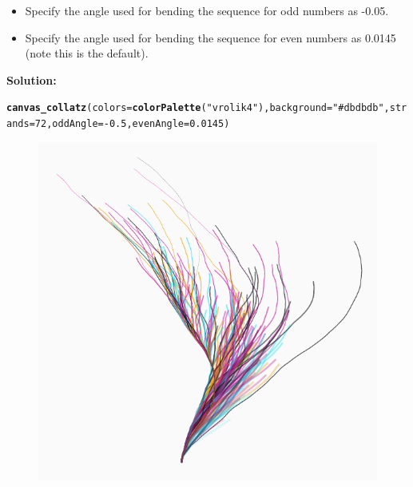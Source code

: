\documentclass{article}\usepackage[]{graphicx}\usepackage[]{xcolor}
\makeatletter
\def\maxwidth{ %
  \ifdim\Gin@nat@width>\linewidth
    \linewidth
  \else
    \Gin@nat@width
  \fi
}
\newcommand{\hlnum}[1]{\textcolor[rgb]{0.686,0.059,0.569}{#1}}%
\newcommand{\hlsng}[1]{\textcolor[rgb]{0.192,0.494,0.8}{#1}}%
\newcommand{\hlopt}[1]{\textcolor[rgb]{0,0,0}{#1}}%
\newcommand{\hldef}[1]{\textcolor[rgb]{0.345,0.345,0.345}{#1}}%
\newcommand{\hlkwc}[1]{\textcolor[rgb]{0.333,0.667,0.333}{#1}}%
\newcommand{\hlkwd}[1]{\textcolor[rgb]{0.737,0.353,0.396}{\textbf{#1}}}%
\newenvironment{kframe}{%
 \def\at@end@of@kframe{}%
 \ifinner\ifhmode%
  \def\at@end@of@kframe{\end{minipage}}%
  \begin{minipage}{\columnwidth}%
 \fi\fi%
 \def\FrameCommand##1{\hskip\@totalleftmargin \hskip-\fboxsep
 \colorbox{shadecolor}{##1}\hskip-\fboxsep
     \hskip-\linewidth \hskip-\@totalleftmargin \hskip\columnwidth}%
 \MakeFramed {\advance\hsize-\width
   \@totalleftmargin\z@ \linewidth\hsize
   \@setminipage}}%
 {\par\unskip\endMakeFramed%
 \at@end@of@kframe}
\newenvironment{knitrout}{}{} %
\makeatother
\begin{document}
\begin{enumerate}
\begin{enumerate}
\begin{itemize}
  \item Specify the angle used for bending the sequence for odd numbers as -0.05.
  \item Specify the angle used for bending the sequence for even numbers as 0.0145 
  (note this is the default).
  \end{itemize}
\textbf{Solution:}
\begin{knitrout}\scriptsize
{}\color{fgcolor}\begin{kframe}
\begin{alltt}
\hlkwd{canvas_collatz}\hldef{(}\hlkwc{colors} \hldef{=} \hlkwd{colorPalette}\hldef{(}\hlsng{"vrolik4"}\hldef{),} \hlkwc{background} \hldef{=} \hlsng{"#dbdbdb"}\hldef{,} \hlkwc{strands} \hldef{=} \hlnum{72}\hldef{,} \hlkwc{oddAngle} \hldef{=} \hlopt{-}\hlnum{0.5}\hldef{,} \hlkwc{evenAngle} \hldef{=} \hlnum{0.0145}\hldef{)}
\end{alltt}
\end{kframe}
\end{knitrout}
\begin{figure}[H]
\begin{center}
\begin{knitrout}
\color{fgcolor}
\includegraphics[width=\maxwidth]{figure/unnamed-chunk-5-1} 

\end{knitrout}
\end{center}
\end{figure}
\end{enumerate}
\end{enumerate}
\end{document}
